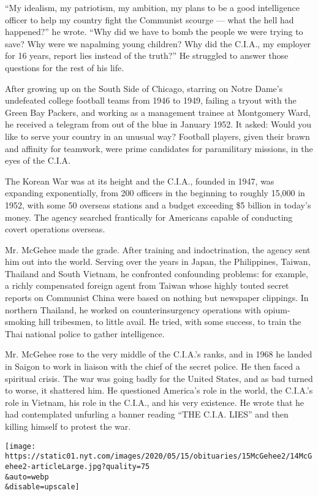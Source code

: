 ``My idealism, my patriotism, my ambition, my plans to be a good
intelligence officer to help my country fight the Communist scourge ---
what the hell had happened?'' he wrote. ``Why did we have to bomb the
people we were trying to save? Why were we napalming young children? Why
did the C.I.A., my employer for 16 years, report lies instead of the
truth?'' He struggled to answer those questions for the rest of his
life.

After growing up on the South Side of Chicago, starring on Notre Dame's
undefeated college football teams from 1946 to 1949, failing a tryout
with the Green Bay Packers, and working as a management trainee at
Montgomery Ward, he received a telegram from out of the blue in January
1952. It asked: Would you like to serve your country in an unusual way?
Football players, given their brawn and affinity for teamwork, were
prime candidates for paramilitary missions, in the eyes of the C.I.A.

The Korean War was at its height and the C.I.A., founded in 1947, was
expanding exponentially, from 200 officers in the beginning to roughly
15,000 in 1952, with some 50 overseas stations and a budget exceeding
\$5 billion in today's money. The agency searched frantically for
Americans capable of conducting covert operations overseas.

Mr. McGehee made the grade. After training and indoctrination, the
agency sent him out into the world. Serving over the years in Japan, the
Philippines, Taiwan, Thailand and South Vietnam, he confronted
confounding problems: for example, a richly compensated foreign agent
from Taiwan whose highly touted secret reports on Communist China were
based on nothing but newspaper clippings. In northern Thailand, he
worked on counterinsurgency operations with opium-smoking hill
tribesmen, to little avail. He tried, with some success, to train the
Thai national police to gather intelligence.

Mr. McGehee rose to the very middle of the C.I.A.'s ranks, and in 1968
he landed in Saigon to work in liaison with the chief of the secret
police. He then faced a spiritual crisis. The war was going badly for
the United States, and as bad turned to worse, it shattered him. He
questioned America's role in the world, the C.I.A.'s role in Vietnam,
his role in the C.I.A., and his very existence. He wrote that he had
contemplated unfurling a banner reading ``THE C.I.A. LIES'' and then
killing himself to protest the war.

\texttt{[image: https://static01.nyt.com/images/2020/05/15/obituaries/15McGehee2/14McGehee2-articleLarge.jpg?quality=75\\\&auto=webp\\\&disable=upscale]}

